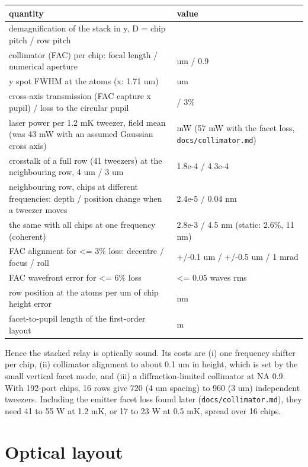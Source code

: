 {\small
\begin{longtable}[]{@{}>{\raggedright\arraybackslash}p{0.531\dimexpr(\linewidth-4\tabcolsep)\relax}>{\raggedright\arraybackslash}p{0.469\dimexpr(\linewidth-4\tabcolsep)\relax}@{}}
\toprule\noalign{}
quantity & value \\
\midrule\noalign{}
\endhead
\bottomrule\noalign{}
\endlastfoot
demagnification of the stack in y, D = chip pitch / row pitch & 125 \\
collimator (FAC) per chip: focal length / numerical aperture & 175 um /
0.9 \\
y spot FWHM at the atoms (x: 1.71 um) & 1.31 um \\
cross-axis transmission (FAC capture x pupil) / loss to the circular
pupil & 0.973 / 3\% \\
laser power per 1.2 mK tweezer, field mean (was 43 mW with an assumed
Gaussian cross axis) & 47 mW (57 mW with the facet loss,
\texttt{docs/collimator.md}) \\
crosstalk of a full row (41 tweezers) at the neighbouring row, 4 um / 3
um & 1.8e-4 / 4.3e-4 \\
neighbouring row, chips at different frequencies: depth / position
change when a tweezer moves & 2.4e-5 / 0.04 nm \\
the same with all chips at one frequency (coherent) & 2.8e-3 / 4.5 nm
(static: 2.6\%, 11 nm) \\
FAC alignment for \textless= 3\% loss: decentre / focus / roll & +/-0.1
um / +/-0.5 um / 1 mrad \\
FAC wavefront error for \textless= 6\% loss & \textless= 0.05 waves
rms \\
row position at the atoms per um of chip height error & 8 nm \\
facet-to-pupil length of the first-order layout & 0.38 m \\
\end{longtable}
}

Hence the stacked relay is optically sound. Its costs are (i) one
frequency shifter per chip, (ii) collimator alignment to about 0.1 um in
height, which is set by the small vertical facet mode, and (iii) a
diffraction-limited collimator at NA 0.9. With 192-port chips, 16 rows
give 720 (4 um spacing) to 960 (3 um) independent tweezers. Including
the emitter facet loss found later (\texttt{docs/collimator.md}), they
need 41 to 55 W at 1.2 mK, or 17 to 23 W at 0.5 mK, spread over 16
chips.

\hypertarget{2-optical-layout}{%
\section{Optical layout}\label{stacked_relay-2-optical-layout}}

